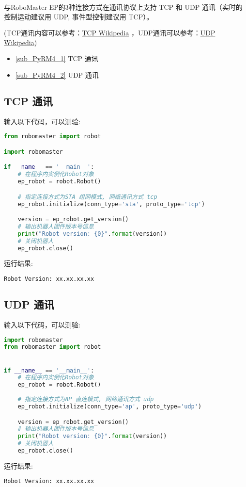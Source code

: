 

与RoboMaster EP的3种连接方式在通讯协议上支持 TCP 和 UDP 通讯（实时的控制运动建议用 UDP, 事件型控制建议用 TCP）。

(TCP通讯内容可以参考：\href{https://en.wikipedia.org/wiki/Transmission_Control_Protocol}{TCP Wikipedia} ，UDP通讯可以参考：\href{https://en.wikipedia.org/wiki/User_Datagram_Protocol}{UDP Wikipedia})

\begin{itemize}
\item \autoref{sub_PyRM4_1} TCP 通讯
\item \autoref{sub_PyRM4_2} UDP 通讯
\end{itemize}

\subsection{TCP 通讯}\label{sub_PyRM4_1}

输入以下代码，可以测验:

\begin{lstlisting}[language=python]
from robomaster import robot

import robomaster

if __name__ == '__main__':
    # 在程序内实例化Robot对象
    ep_robot = robot.Robot()

    # 指定连接方式为STA 组网模式, 网络通讯方式 tcp
    ep_robot.initialize(conn_type='sta', proto_type='tcp')

    version = ep_robot.get_version()
    # 输出机器人固件版本号信息
    print("Robot version: {0}".format(version))
    # 关闭机器人
    ep_robot.close()

\end{lstlisting}

运行结果:
\begin{lstlisting}[language=pythonC]
Robot Version: xx.xx.xx.xx
\end{lstlisting}

\subsection{UDP 通讯}\label{sub_PyRM4_2}

输入以下代码，可以测验:

\begin{lstlisting}[language=python]
import robomaster
from robomaster import robot


if __name__ == '__main__':
    # 在程序内实例化Robot对象
    ep_robot = robot.Robot()
    
    # 指定连接方式为AP 直连模式, 网络通讯方式 udp
    ep_robot.initialize(conn_type='ap', proto_type='udp')

    version = ep_robot.get_version()
    # 输出机器人固件版本号信息
    print("Robot version: {0}".format(version))
    # 关闭机器人
    ep_robot.close()
\end{lstlisting}

运行结果:
\begin{lstlisting}[language=pythonC]
Robot Version: xx.xx.xx.xx
\end{lstlisting}
